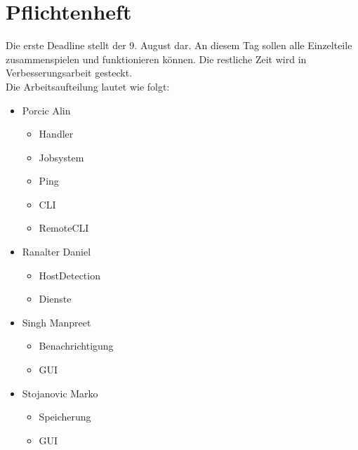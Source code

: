 \documentclass[10pt,a4paper]{report}
\begin{document}
\chapter{Pflichtenheft}
Die erste Deadline stellt der 9. August dar. An diesem Tag sollen alle Einzelteile zusammenspielen und funktionieren können. Die restliche Zeit wird in Verbesserungsarbeit gesteckt.\\
Die Arbeitsaufteilung lautet wie folgt:
\begin{itemize}
\item Porcic Alin
\begin{itemize}
\item Handler
\item Jobsystem
\item Ping
\item CLI
\item RemoteCLI
\end{itemize}
\item Ranalter Daniel
\begin{itemize}
\item HostDetection
\item Dienste
\end{itemize}
\item Singh Manpreet
\begin{itemize}
\item Benachrichtigung
\item GUI
\end{itemize}
\item Stojanovic Marko
\begin{itemize}
\item Speicherung
\item GUI
\end{itemize}
\end{itemize}
\end{document}
